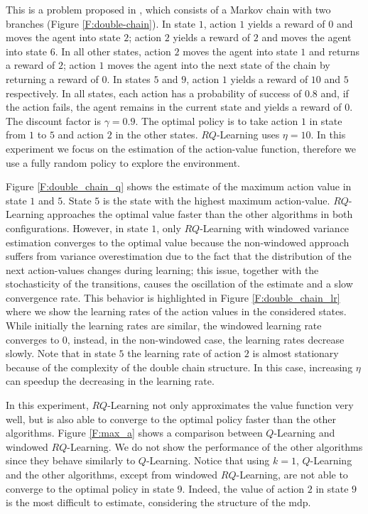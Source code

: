 This is a problem proposed in \cite{Peters2010RelativeEP}, which consists of a Markov chain with two branches (Figure \ref{F:double-chain}). In state $1$, action $1$ yields a reward of $0$ and moves the agent into state $2$; action $2$ yields a reward of $2$ and moves the agent into state $6$. In all other states, action $2$ moves the agent into state $1$ and returns a reward of $2$; action $1$ moves the agent into the next state of the chain by returning a reward of $0$. In states $5$ and $9$, action $1$ yields a reward of $10$ and $5$ respectively. In all states, each action has a probability of success of $0.8$ and, if the action fails, the agent remains in the current state and yields a reward of $0$. The discount factor is $\gamma = 0.9$. The optimal policy is to take action $1$ in state from $1$ to $5$ and action $2$ in the other states. $RQ$-Learning uses $\eta = 10$. In this experiment we focus on the estimation of the action-value function, therefore we use a fully random policy to explore the environment.

Figure \ref{F:double_chain_q} shows the estimate of the maximum action value in state $1$ and $5$. State $5$ is the state with the highest maximum action-value. $RQ$-Learning approaches the optimal value faster than the other algorithms in both configurations. However, in state $1$, only $RQ$-Learning with windowed variance estimation converges to the optimal value because the non-windowed approach suffers from variance overestimation due to the fact that the distribution of the next action-values changes during learning; this issue, together with the stochasticity of the transitions, causes the oscillation of the estimate and a slow convergence rate. This behavior is highlighted in Figure \ref{F:double_chain_lr} where we show the learning rates of the action values in the considered states. While initially the learning rates are similar, the windowed learning rate converges to $0$, instead, in the non-windowed case, the learning rates decrease slowly. Note that in state $5$ the learning rate of action $2$ is almost stationary because of the complexity of the double chain structure. In this case, increasing $\eta$ can speedup the decreasing in the learning rate.

In this experiment, $RQ$-Learning not only approximates the value function very well, but is also able to converge to the optimal policy faster than the other algorithms. Figure \ref{F:max_a} shows a comparison between $Q$-Learning and windowed $RQ$-Learning. We do not show the performance of the other algorithms since they behave similarly to $Q$-Learning. Notice that using $k = 1$, $Q$-Learning and the other algorithms, except from windowed $RQ$-Learning, are not able to converge to the optimal policy in state $9$. Indeed, the value of action $2$ in state $9$ is the most difficult to estimate, considering the structure of the \gls{mdp}.

